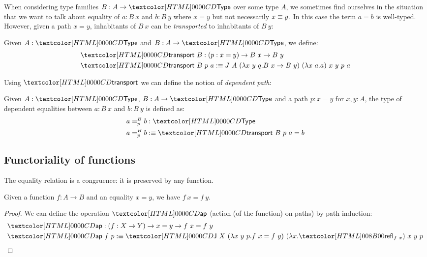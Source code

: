 When considering type families $B : A \to \Type$ over some type $A$, we
sometimes find ourselves in the situation that we want to talk about
equality of $a : B\ x$ and $b : B\ y$ where $x = y$ but not
necessarily $x \equiv y$. In this case the term $a = b$ is
well-typed. However, given a path $x = y$, inhabitants of $B\ x$ can
be \emph{transported} to inhabitants of $B\ y$:
\begin{definition}
  Given $A : \Type$ and $B : A \to \Type$, we define:
  \begin{align*}
    &\transport\ B : (p : x = y) \to B\ x \to B\ y \\
    &\transport\ B\ p\ a \ddefeq J\ A\ (\lambda x\ y\ q . B\ x \to B\ y)\ (\lambda x\ a . a)\ x\ y\ p\ a
  \end{align*}
\end{definition}

Using $\transport$ we can define the notion of \emph{dependent path}:
\begin{definition}
  Given $A : \Type$, $B : A \to \Type$ and a path $p : x = y$ for
  $x, y : A$, the type of dependent equalities between $a : B\ x$ and
  $b : B\ y$ is defined as:
  \begin{align*}
    &\pathover{B}{p}{a}{b} : \Type \\
    &\pathover{B}{p}{a}{b} \ddefeq \transport\ B\ p\ a = b
  \end{align*}
\end{definition}

\subsection{Functoriality of functions}

The equality relation is a congruence: it is preserved by any function.

\begin{proposition}
  Given a function $f : A \to B$ and an equality $x = y$, we have
  $f\ x = f\ y$.
\end{proposition}

\begin{proof}
  We can define the operation $\ap$ (action (of the function) on
  paths) by path induction:
  \begin{align*}
    &\ap : (f : X \to Y) \to x = y \to f\ x = f\ y \\
    &\ap\ f\ p \ddefeq \J\ X\ (\lambda x\ y\ p . f\ x = f\ y)\ (\lambda x . \refl_{f\ x})\ x\ y\ p
  \end{align*}
\end{proof}

